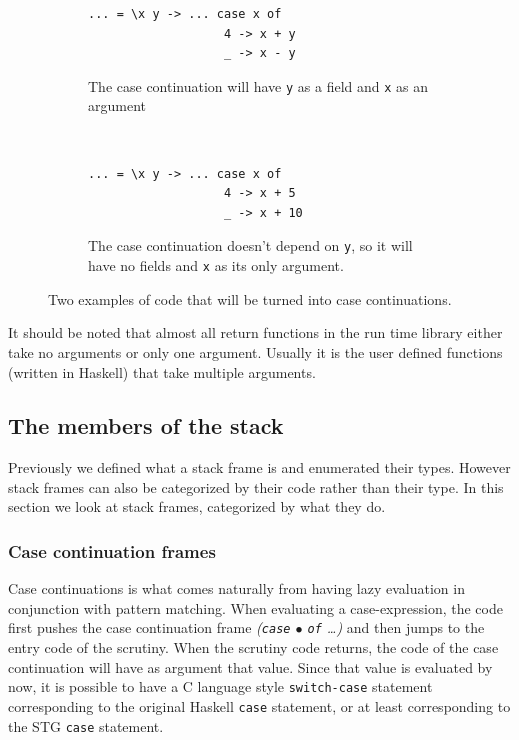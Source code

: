 \begin{figure}
\begin{mdframed}
        \begin{subfigure}[t]{0.5\textwidth}
          \begin{verbatim}
... = \x y -> ... case x of
                   4 -> x + y
                   _ -> x - y
          \end{verbatim}
          \caption{The case continuation will have \texttt{y} as a field
and \texttt{x} as an argument}
        \end{subfigure}
    ~ %
        \begin{subfigure}[t]{0.5\textwidth}
          \begin{verbatim}
... = \x y -> ... case x of
                   4 -> x + 5
                   _ -> x + 10
          \end{verbatim}
          \caption{The case continuation doesn't depend on \texttt{y},
so it will have no fields and \texttt{x} as its only argument.}
        \end{subfigure}
  \caption{Two examples of code that will be turned into case
continuations.}
  \label{fig:field_and_arguments}
\end{mdframed}
\end{figure}

It should be noted that almost all return functions in the run time library
either take no arguments or only one argument.
Usually it is the user defined functions (written in Haskell)
that take multiple arguments.

\subsection{The members of the stack}

Previously we defined what a stack frame is and enumerated
their types. However stack frames can also be categorized by their
code rather than their type. In this
section we look at stack frames, categorized by what they do.

\subsubsection{Case continuation frames}

Case continuations is what comes naturally from having lazy evaluation
in conjunction with pattern matching. When evaluating a case-expression, the code first
pushes the case continuation frame \emph{(\texttt{case} $\bullet$ \texttt{of}
\dots)} and then jumps to the entry code of the scrutiny. When the
scrutiny code returns, the code of the case continuation will have
as argument that value. Since that value is evaluated by now, it is
possible to have a C language style \texttt{switch-case} statement
corresponding to the original Haskell \texttt{case} statement,
or at least corresponding to the STG \texttt{case} statement.

